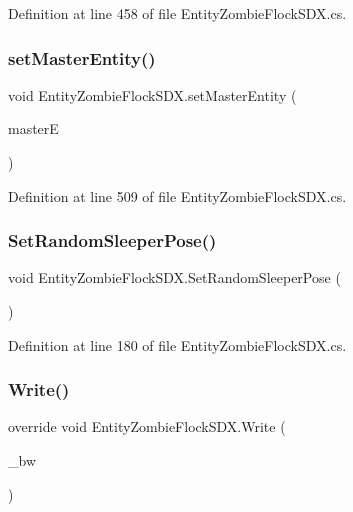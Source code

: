 Definition at line 458 of file Entity\+Zombie\+Flock\+S\+D\+X.\+cs.

\mbox{\label{class_entity_zombie_flock_s_d_x_a8ea9d4853508a5d7d547e1e8b27c1b66}} 
\subsubsection{\texorpdfstring{setMasterEntity()}{setMasterEntity()}}
{\footnotesize\ttfamily void Entity\+Zombie\+Flock\+S\+D\+X.\+set\+Master\+Entity (\begin{DoxyParamCaption}\item[{Entity\+Alive}]{masterE }\end{DoxyParamCaption})}



Definition at line 509 of file Entity\+Zombie\+Flock\+S\+D\+X.\+cs.

\mbox{\label{class_entity_zombie_flock_s_d_x_ab32af08d3a224ee4f651b19c97b612cc}} 
\subsubsection{\texorpdfstring{SetRandomSleeperPose()}{SetRandomSleeperPose()}}
{\footnotesize\ttfamily void Entity\+Zombie\+Flock\+S\+D\+X.\+Set\+Random\+Sleeper\+Pose (\begin{DoxyParamCaption}{ }\end{DoxyParamCaption})}



Definition at line 180 of file Entity\+Zombie\+Flock\+S\+D\+X.\+cs.

\mbox{\label{class_entity_zombie_flock_s_d_x_aa40097723a711d8d61176d329fd59358}} 
\subsubsection{\texorpdfstring{Write()}{Write()}}
{\footnotesize\ttfamily override void Entity\+Zombie\+Flock\+S\+D\+X.\+Write (\begin{DoxyParamCaption}\item[{Binary\+Writer}]{\+\_\+bw }\end{DoxyParamCaption})}



